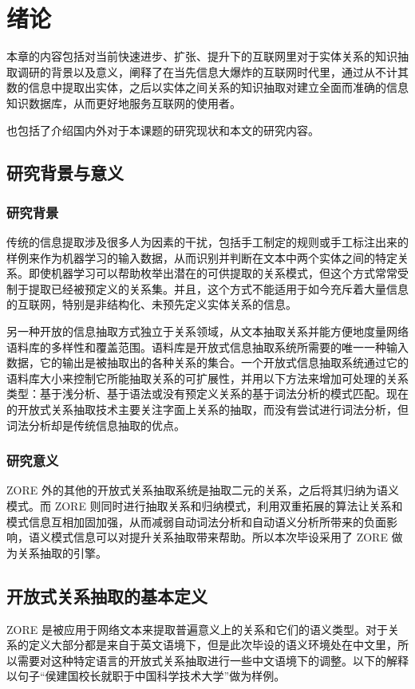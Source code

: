 \chapter{绪论}
\label{chap:introduction}

本章的内容包括对当前快速进步、扩张、提升下的互联网里对于实体关系的知识抽取调研的背景以及意义，阐释了在当先信息大爆炸的互联网时代里，通过从不计其数的信息中提取出实体，之后以实体之间关系的知识抽取对建立全面而准确的信息知识数据库，从而更好地服务互联网的使用者。

也包括了介绍国内外对于本课题的研究现状和本文的研究内容。

\section{研究背景与意义}
\subsection{研究背景}

传统的信息提取涉及很多人为因素的干扰，包括手工制定的规则或手工标注出来的样例来作为机器学习的输入数据，从而识别并判断在文本中两个实体之间的特定关系\citep{wang}。即使机器学习可以帮助枚举出潜在的可供提取的关系模式，但这个方式常常受制于提取已经被预定义的关系集。并且，这个方式不能适用于如今充斥着大量信息的互联网，特别是非结构化、未预先定义实体关系的信息。

另一种开放的信息抽取\citep{banko}方式独立于关系领域，从文本抽取关系并能方便地度量网络语料库的多样性和覆盖范围。语料库是开放式信息抽取系统所需要的唯一一种输入数据，它的输出是被抽取出的各种关系的集合。一个开放式信息抽取系统通过它的语料库大小来控制它所能抽取关系的可扩展性，并用以下方法来增加可处理的关系类型：基于浅分析、基于语法或没有预定义关系的基于词法分析的模式匹配\citep{wu2010, naka2012, etz2011}。现在的开放式关系抽取技术主要关注字面上关系的抽取，而没有尝试进行词法分析，但词法分析却是传统信息抽取的优点。

\subsection{研究意义}
ZORE 外的其他的开放式关系抽取系统是抽取二元的关系，之后将其归纳为语义模式。而 ZORE 则同时进行抽取关系和归纳模式，利用双重拓展的算法让关系和模式信息互相加固加强，从而减弱自动词法分析和自动语义分析所带来的负面影响，语义模式信息可以对提升关系抽取带来帮助。所以本次毕设采用了 ZORE 做为关系抽取的引擎。

\section{开放式关系抽取的基本定义}
ZORE 是被应用于网络文本来提取普遍意义上的关系和它们的语义类型。对于关系的定义大部分都是来自于英文语境下，但是此次毕设的语义环境处在中文里，所以需要对这种特定语言的开放式关系抽取进行一些中文语境下的调整。以下的解释以句子“侯建国校长就职于中国科学技术大学”做为样例。

